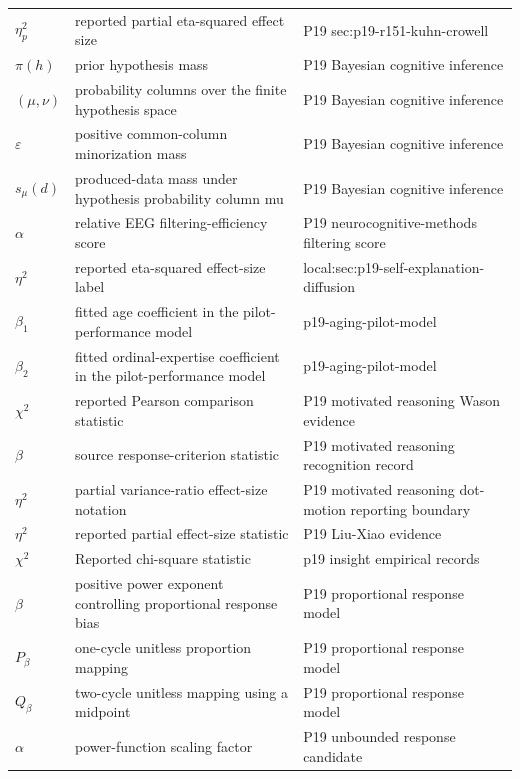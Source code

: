 \begin{longtable}{@{}p{}p{}p{}@{}}
\(\eta_p^2\) & reported partial eta-squared effect size & P19 sec:\allowbreak{}p19-\allowbreak{}r151-\allowbreak{}kuhn-\allowbreak{}crowell \\
\(\pi(h)\) & prior hypothesis mass & P19 Bayesian cognitive inference \\
\((\mu,\allowbreak \nu)\) & probability columns over the finite hypothesis space & P19 Bayesian cognitive inference \\
\(\varepsilon\) & positive common-column minorization mass & P19 Bayesian cognitive inference \\
\(s_\mu(d)\) & produced-data mass under hypothesis probability column mu & P19 Bayesian cognitive inference \\
\(\alpha\) & relative EEG filtering-efficiency score & P19 neurocognitive-\allowbreak{}methods filtering score \\
\(\eta^2\) & reported eta-squared effect-size label & local:\allowbreak{}sec:\allowbreak{}p19-\allowbreak{}self-\allowbreak{}explanation-\allowbreak{}diffusion \\
\(\beta_1\) & fitted age coefficient in the pilot-performance model & p19-\allowbreak{}aging-\allowbreak{}pilot-\allowbreak{}model \\
\(\beta_2\) & fitted ordinal-expertise coefficient in the pilot-performance model & p19-\allowbreak{}aging-\allowbreak{}pilot-\allowbreak{}model \\
\(\chi^2\) & reported Pearson comparison statistic & P19 motivated reasoning Wason evidence \\
\(\beta\) & source response-criterion statistic & P19 motivated reasoning recognition record \\
\(\eta^2\) & partial variance-ratio effect-size notation & P19 motivated reasoning dot-\allowbreak{}motion reporting boundary \\
\(\eta^2\) & reported partial effect-size statistic & P19 Liu-\allowbreak{}Xiao evidence \\
\ensuremath{\chi^2} & Reported chi-square statistic & p19 insight empirical records \\
\(\beta\) & positive power exponent controlling proportional response bias & P19 proportional response model \\
\(P_\beta\) & one-cycle unitless proportion mapping & P19 proportional response model \\
\(Q_\beta\) & two-cycle unitless mapping using a midpoint & P19 proportional response model \\
\(\alpha\) & power-function scaling factor & P19 unbounded response candidate \\

\end{longtable}
